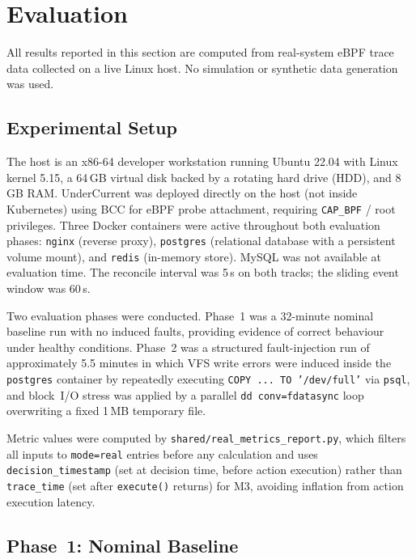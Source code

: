 \documentclass[runningheads]{llncs}
\begin{document}
\section{Evaluation}
\label{sec:eval}

All results reported in this section are computed from real-system eBPF
trace data collected on a live Linux host. No simulation or synthetic
data generation was used.

\subsection{Experimental Setup}

The host is an x86-64 developer workstation running Ubuntu 22.04 with
Linux kernel 5.15, a 64\,GB virtual disk backed by a rotating hard
drive (HDD), and 8\,GB RAM. UnderCurrent was deployed directly on the
host (not inside Kubernetes) using BCC for eBPF probe attachment,
requiring \texttt{CAP\_BPF} / root privileges. Three Docker containers
were active throughout both evaluation phases: \texttt{nginx} (reverse
proxy), \texttt{postgres} (relational database with a persistent volume
mount), and \texttt{redis} (in-memory store). MySQL was not available
at evaluation time. The reconcile interval was 5\,s on both tracks;
the sliding event window was 60\,s.

Two evaluation phases were conducted. Phase~1 was a 32-minute nominal
baseline run with no induced faults, providing evidence of correct
behaviour under healthy conditions. Phase~2 was a structured
fault-injection run of approximately 5.5 minutes in which VFS write
errors were induced inside the \texttt{postgres} container by
repeatedly executing \texttt{COPY ... TO '/dev/full'} via
\texttt{psql}, and block~I/O stress was applied by a parallel
\texttt{dd conv=fdatasync} loop overwriting a fixed 1\,MB temporary
file.

Metric values were computed by \texttt{shared/real\_metrics\_report.py},
which filters all inputs to \texttt{mode=real} entries before any
calculation and uses \texttt{decision\_timestamp} (set at decision
time, before action execution) rather than \texttt{trace\_time} (set
after \texttt{execute()} returns) for M3, avoiding inflation from
action execution latency.

\subsection{Phase~1: Nominal Baseline}
\end{document}
